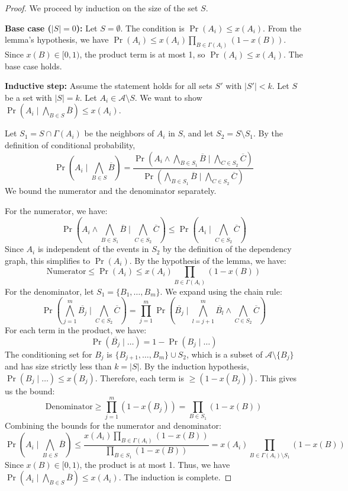 \begin{proof}
We proceed by induction on the size of the set $S$.

\textbf{Base case ($|S|=0$):} Let $S = \emptyset$. The condition is $\Pr(A_i) \leq x(A_i)$. From the lemma's hypothesis, we have $\Pr(A_i) \leq x(A_i) \prod_{B \in \Gamma(A_i)} (1 - x(B))$. Since $x(B) \in [0, 1)$, the product term is at most 1, so $\Pr(A_i) \leq x(A_i)$. The base case holds.

\textbf{Inductive step:} Assume the statement holds for all sets $S'$ with $|S'| < k$. Let $S$ be a set with $|S| = k$. Let $A_i \in \mathcal{A} \setminus S$. We want to show $\Pr(A_i \mid \bigwedge_{B \in S} \overline{B}) \leq x(A_i)$.

Let $S_1 = S \cap \Gamma(A_i)$ be the neighbors of $A_i$ in $S$, and let $S_2 = S \setminus S_1$. By the definition of conditional probability,
$$\Pr\left(A_i \mid \bigwedge_{B \in S} \overline{B}\right) = \frac{\Pr\left(A_i \wedge \bigwedge_{B \in S_1} \overline{B} \mid \bigwedge_{C \in S_2} \overline{C}\right)}{\Pr\left(\bigwedge_{B \in S_1} \overline{B} \mid \bigwedge_{C \in S_2} \overline{C}\right)}$$
We bound the numerator and the denominator separately.

For the numerator, we have:
$$\Pr\left(A_i \wedge \bigwedge_{B \in S_1} \overline{B} \mid \bigwedge_{C \in S_2} \overline{C}\right) \leq \Pr\left(A_i \mid \bigwedge_{C \in S_2} \overline{C}\right)$$
Since $A_i$ is independent of the events in $S_2$ by the definition of the dependency graph, this simplifies to $\Pr(A_i)$. By the hypothesis of the lemma, we have:
$$\text{Numerator} \leq \Pr(A_i) \leq x(A_i) \prod_{B \in \Gamma(A_i)} (1 - x(B))$$
For the denominator, let $S_1 = \{B_1, \ldots, B_m\}$. We expand using the chain rule:
$$\Pr\left(\bigwedge_{j=1}^m \overline{B_j} \mid \bigwedge_{C \in S_2} \overline{C}\right) = \prod_{j=1}^m \Pr\left(\overline{B_j} \mid \bigwedge_{l=j+1}^m \overline{B_l} \wedge \bigwedge_{C \in S_2} \overline{C}\right)$$
For each term in the product, we have:
$$\Pr\left(\overline{B_j} \mid \dots\right) = 1 - \Pr\left(B_j \mid \dots\right)$$
The conditioning set for $B_j$ is $\{B_{j+1}, \ldots, B_m\} \cup S_2$, which is a subset of $\mathcal{A} \setminus \{B_j\}$ and has size strictly less than $k=|S|$. By the induction hypothesis, $\Pr(B_j \mid \dots) \leq x(B_j)$. Therefore, each term is $\geq (1 - x(B_j))$. This gives us the bound:
$$\text{Denominator} \geq \prod_{j=1}^m (1 - x(B_j)) = \prod_{B \in S_1} (1 - x(B))$$
Combining the bounds for the numerator and denominator:
$$\Pr\left(A_i \mid \bigwedge_{B \in S} \overline{B}\right) \leq \frac{x(A_i) \prod_{B \in \Gamma(A_i)} (1 - x(B))}{\prod_{B \in S_1} (1 - x(B))} = x(A_i) \prod_{B \in \Gamma(A_i) \setminus S_1} (1 - x(B))$$
Since $x(B) \in [0,1)$, the product is at most 1. Thus, we have $\Pr(A_i \mid \bigwedge_{B \in S} \overline{B}) \leq x(A_i)$. The induction is complete.
\end{proof}

